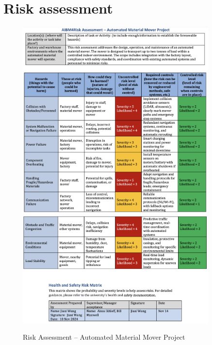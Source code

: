 \documentclass[12pt]{article}
\begin{document}
\newpage 
 \section{Risk assessment }
 
\begin{figure}[h!]
    \centering
    \includegraphics[width=0.9\textwidth]{Risk_Assessment_Automated_Material_Mover_Project1.png}
    \includegraphics[width=0.9\textwidth]{Risk_Assessment_Automated_Material_Mover_Project2.png}
    \caption{Risk Assessment – Automated Material Mover Project}
    \label{fig:risk_assessment}
\end{figure}



\end{document}
